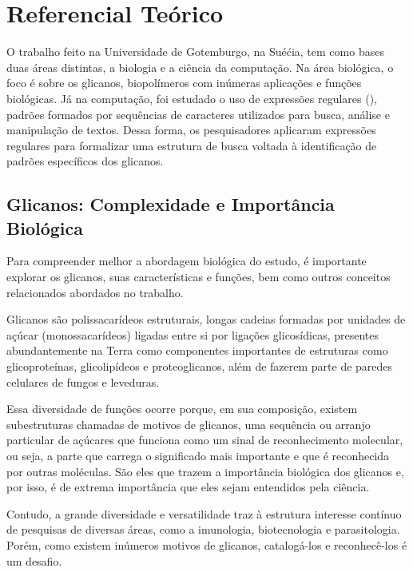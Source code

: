 \chapter{Referencial Teórico}

O trabalho feito na Universidade de Gotemburgo, na Suéćia, tem como bases duas 
áreas distintas, a biologia e a ciência da computação. Na área biológica, o foco 
é sobre os glicanos, biopolímeros com inúmeras aplicações e funções biológicas. 
Já na computação, foi estudado o uso de expressões regulares 
(), padrões formados por sequências 
de caracteres utilizados para busca, análise e manipulação de textos. Dessa 
forma, os pesquisadores aplicaram expressões regulares para formalizar uma 
estrutura de busca voltada à identificação de padrões específicos dos glicanos.

\section{Glicanos: Complexidade e Importância Biológica}

Para compreender melhor a abordagem biológica do estudo, é importante explorar 
os glicanos, suas características e funções, bem como outros conceitos 
relacionados abordados no trabalho.

\begin{definition}
  Glicanos são polissacarídeos estruturais, longas cadeias formadas por unidades 
  de açúcar (monossacarídeos) ligadas entre si por ligações glicosídicas, presentes 
  abundantemente na Terra como componentes importantes de estruturas como 
  glicoproteínas, glicolipídeos e proteoglicanos, além de fazerem parte de 
  paredes celulares de fungos e leveduras.
\end{definition}

Essa diversidade de funções ocorre porque, em sua composição, existem 
subestruturas chamadas de motivos de glicanos, uma sequência ou arranjo 
particular de açúcares que funciona como um sinal de reconhecimento molecular, 
ou seja, a parte que carrega o significado mais importante e que é reconhecida 
por outras moléculas. São eles que trazem a importância biológica dos glicanos 
e, por isso, é de extrema importância que eles sejam entendidos pela ciência. 

Contudo, a grande diversidade e versatilidade traz à estrutura interesse 
contínuo de pesquisas de diversas áreas, como a imunologia, biotecnologia e 
parasitologia. Porém, como existem inúmeros motivos de glicanos, catalogá-los e 
reconhecê-los é um desafio.

